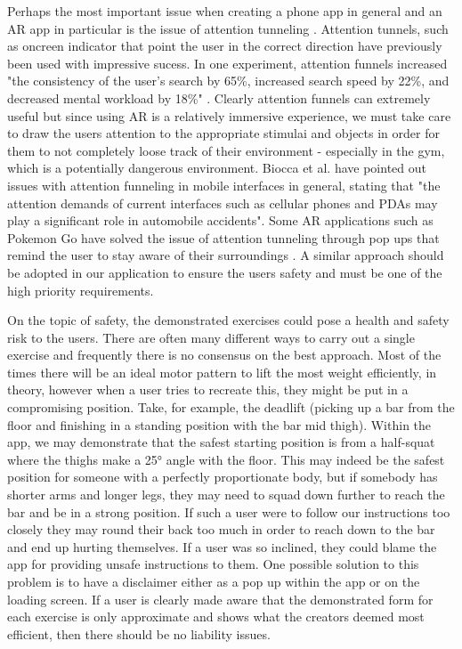 \documentclass{l4proj}
\begin{document}
Perhaps the most important issue when creating a phone app in general and an AR app in particular is the issue of attention tunneling \cite{radu_why_2012} \cite{biocca_attention_2007}. Attention tunnels, such as oncreen indicator that point the user in the correct direction have previously been used with impressive sucess\cite{biocca_attention_2007}. In one experiment, attention funnels increased "the consistency of the user’s search by 65\%,  increased search speed by 22\%, and decreased mental workload by 18\%" \cite{biocca_attention_2007}. Clearly attention funnels can extremely useful but since using AR is a relatively immersive experience, we must take care to draw the users attention to the appropriate stimulai and objects in order for them to not completely loose track of their environment - especially in the gym, which is a potentially dangerous environment. Biocca et al. have pointed out issues with attention funneling in mobile interfaces in general, stating that "the attention demands of current interfaces such as cellular phones and PDAs may play a significant role in automobile accidents". Some AR applications such as Pokemon Go have solved the issue of attention tunneling through pop ups that remind the user to stay aware of their surroundings \cite{hollister_drivers_2016}. A similar approach should be adopted in our application to ensure the users safety and must be one of the high priority requirements.

On the topic of safety, the demonstrated exercises could pose a health and safety risk to the users. There are often many different ways to carry out a single exercise and frequently there is no consensus on the best approach. Most of the times there will be an ideal motor pattern to lift the most weight efficiently, in theory, however when a user tries to recreate this, they might be put in a compromising position. Take, for example, the deadlift (picking up a bar from the floor and finishing in a standing position with the bar mid thigh). Within the app, we may demonstrate that the safest starting position is from a half-squat where the thighs make a 25° angle with the floor. This may indeed be the safest position for someone with a perfectly proportionate body, but if somebody has shorter arms and longer legs, they may need to squad down further to reach the bar and be in a strong position. If such a user were to follow our instructions too closely they may round their back too much in order to reach down to the bar and end up hurting themselves. If a user was so inclined, they could blame the app for providing unsafe instructions to them. One possible solution to this problem is to have a disclaimer either as a pop up within the app or on the loading screen. If a user is clearly made aware that the demonstrated form for each exercise is only approximate and shows what the creators deemed most efficient, then there should be no liability issues. 
\end{document}
